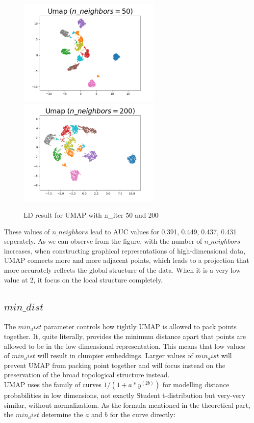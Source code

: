\begin{figure}[H]
{
\label{Fig.sub.1}
\includegraphics[width=7cm,height=3.5cm\textwidth]{images/umap/umap_digit_n_neighbor_50.png}}
{
\label{Fig.sub.2}
\includegraphics[width=7cm,height=3.5cm\textwidth]{images/umap/umap_digit_n_neighbor_200.png}}
\caption{LD result for UMAP with n\_iter 50 and 200}
\end{figure}

\noindent These values of $n\_neighbors$ lead to AUC values for 0.391, 0.449, 0.437, 0.431 seperately. As we can observe from the figure, with the number of $n\_neighbors$ increases, when constructing graphical representations of high-dimensional data, UMAP connects more and more adjacent points, which leads to a projection that more accurately reflects the global structure of the data. When it is a very low value at 2, it focus on the local structure completely. \\

\subsection{$min\_dist$}

The $min_dist$ parameter controls how tightly UMAP is allowed to pack points together. It, quite literally, provides the minimum distance apart that points are allowed to be in the low dimensional representation. This means that low values of $min_dist$ will result in clumpier embeddings. Larger values of $min_dist$ will prevent UMAP from packing point together and will focus instead on the preservation of the broad topological structure instead.\\

\noindent UMAP uses the family of curves $1 / (1+a*y^(2b))$ for modelling distance probabilities in low dimensions, not exactly Student t-distribution but very-very similar, without normalizatiom. As the formula mentioned in the theoretical part, the $min_dist$ determine the $a$ and $b$ for the curve directly:


